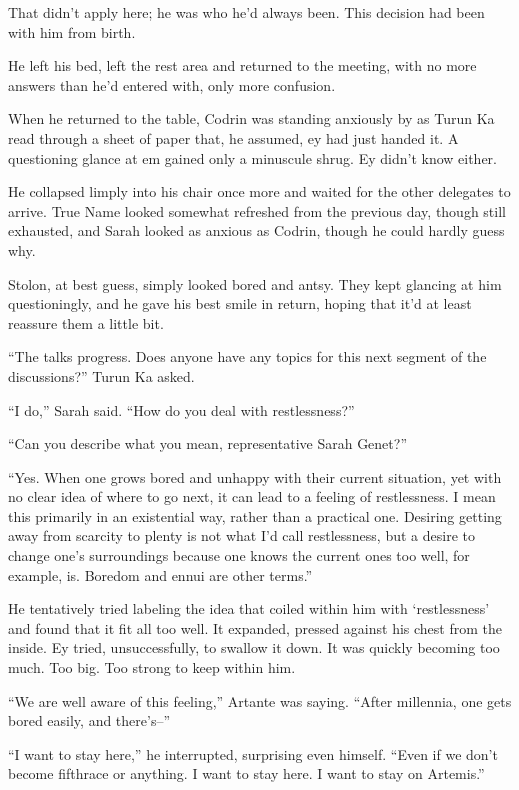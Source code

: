 That didn't apply here; he was who he'd always been. This decision had been with him from birth.

He left his bed, left the rest area and returned to the meeting, with no more answers than he'd entered with, only more confusion.

When he returned to the table, Codrin was standing anxiously by as Turun Ka read through a sheet of paper that, he assumed, ey had just handed it. A questioning glance at em gained only a minuscule shrug. Ey didn't know either.

He collapsed limply into his chair once more and waited for the other delegates to arrive. True Name looked somewhat refreshed from the previous day, though still exhausted, and Sarah looked as anxious as Codrin, though he could hardly guess why.

Stolon, at best guess, simply looked bored and antsy. They kept glancing at him questioningly, and he gave his best smile in return, hoping that it'd at least reassure them a little bit.

``The talks progress. Does anyone have any topics for this next segment of the discussions?'' Turun Ka asked.

``I do,'' Sarah said. ``How do you deal with restlessness?''

``Can you describe what you mean, representative Sarah Genet?''

``Yes. When one grows bored and unhappy with their current situation, yet with no clear idea of where to go next, it can lead to a feeling of restlessness. I mean this primarily in an existential way, rather than a practical one. Desiring getting away from scarcity to plenty is not what I'd call restlessness, but a desire to change one's surroundings because one knows the current ones too well, for example, is. Boredom and ennui are other terms.''

He tentatively tried labeling the idea that coiled within him with `restlessness' and found that it fit all too well. It expanded, pressed against his chest from the inside. Ey tried, unsuccessfully, to swallow it down. It was quickly becoming too much. Too big. Too strong to keep within him.

``We are well aware of this feeling,'' Artante was saying. ``After millennia, one gets bored easily, and there's--''

``I want to stay here,'' he interrupted, surprising even himself. ``Even if we don't become fifthrace or anything. I want to stay here. I want to stay on Artemis.''

